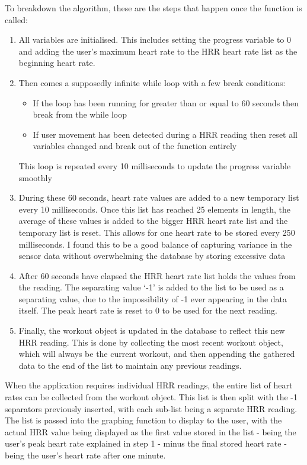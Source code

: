 \documentclass{l4proj}
\begin{document}
To breakdown the algorithm, these are the steps that happen once the function is called:

\begin{enumerate}
    \item All variables are initialised. This includes setting the progress variable to 0 and adding the user’s maximum heart rate to the HRR heart rate list as the beginning heart rate.
    \item Then comes a supposedly infinite while loop with a few break conditions:
    \begin{itemize}
        \item If the loop has been running for greater than or equal to 60 seconds then break from the while loop
        \item If user movement has been detected during a HRR reading then reset all variables changed and break out of the function entirely
    \end{itemize}
    This loop is repeated every 10 milliseconds to update the progress variable smoothly
    \item During these 60 seconds, heart rate values are added to a new temporary list every 10 milliseconds. Once this list has reached 25 elements in length, the average of these values is added to the bigger HRR heart rate list and the temporary list is reset. This allows for one heart rate to be stored every 250 milliseconds. I found this to be a good balance of capturing variance in the sensor data without overwhelming the database by storing excessive data
    \item After 60 seconds have elapsed the HRR heart rate list holds the values from the reading. The separating value ‘-1’ is added to the list to be used as a separating value, due to the impossibility of -1 ever appearing in the data itself. The peak heart rate is reset to 0 to be used for the next reading.
    \item Finally, the workout object is updated in the database to reflect this new HRR reading. This is done by collecting the most recent workout object, which will always be the current workout, and then appending the gathered data to the end of the list to maintain any previous readings.
\end{enumerate}

When the application requires individual HRR readings, the entire list of heart rates can be collected from the workout object. This list is then split with the -1 separators previously inserted, with each sub-list being a separate HRR reading. The list is passed into the graphing function to display to the user, with the actual HRR value being displayed as the first value stored in the list - being the user’s peak heart rate explained in step 1 - minus the final stored heart rate - being the user’s heart rate after one minute.
\end{document}
